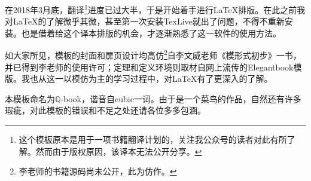 \begin{overview}
\thispagestyle{empty}
在2018年3月底，翻译\footnote{这个模板原本是用于一项书籍翻译计划的，关注我公众号的读者对此有所了解。然而由于版权原因，该译本无法公开分享。}进度已过大半，于是开始着手进行\LaTeX 排版。在此之前我对\LaTeX 的了解微乎其微，甚至第一次安装TexLive就出了问题，不得不重新安装。也是借着给这个译本排版的机会，才逐渐熟悉了这一软件的使用方法。

如大家所见，模板的封面和扉页设计均高仿\footnote{李老师的书籍源码尚未公开，此为仿作。}自李文威老师《模形式初步》一书，并已得到李老师的使用许可；定理和定义环境则取材自网上流传的Elegantbook模版。我也从这一以模仿为主的学习过程中，对\LaTeX 有了更深入的了解。

本模板命名为$\mathbb{ Q }$-book，谐音自cubic一词。由于是一个菜鸟的作品，自然还有许多瑕疵，对此模板的错误和不足之处还请各位多多包涵。

\end{overview}
